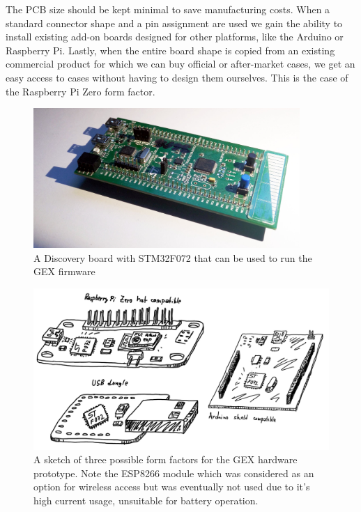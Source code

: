 The PCB size should be kept minimal to save manufacturing costs. When a standard connector shape and a pin assignment are used we gain the ability to install existing add-on boards designed for other platforms, like the Arduino or Raspberry Pi. Lastly, when the entire board shape is copied from an existing commercial product for which we can buy official or after-market cases, we get an easy access to cases without having to design them ourselves. This is the case of the Raspberry Pi Zero form factor.

\begin{figure}
	\centering
	\includegraphics[width=0.9\textwidth] {img/disco072.jpg}
	\caption[A Discovery board with STM32F072]{\label{fig:discovery}A Discovery board with STM32F072 that can be used to run the GEX firmware}
\end{figure}


\begin{figure}
	\centering
	\includegraphics[width=\textwidth] {img/gex-ff-sketches.png}
	\caption[Form factor sketches]{\label{fig:ff-sketches}A sketch of three possible form factors for the GEX hardware prototype. Note the ESP8266 module which was considered as an option for wireless access but was eventually not used due to it's high current usage, unsuitable for battery operation.}
\end{figure}














